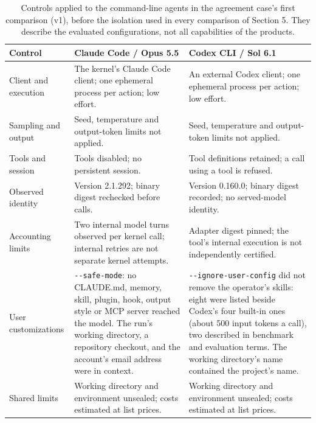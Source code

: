 \begin{longtable}{@{}P{1.25in}P{2.6in}P{2.6in}@{}}
\caption{Controls applied to the command-line agents in the agreement case's first comparison (v1), before the
isolation used in every comparison of Section 5. They describe the evaluated configurations, not all capabilities
of the products.}
\label{tab:cli-controls}\\
\toprule
\textbf{Control} & \textbf{Claude Code / Opus 5.5} & \textbf{Codex CLI / Sol 6.1}\\
\midrule\endfirsthead
\endhead\endfoot\endlastfoot
Client and execution & The kernel's Claude Code client; one ephemeral process per action; low effort. & An external Codex client; one ephemeral process per action; low effort.\\
Sampling and output & Seed, temperature and output-token limits not applied. & Seed, temperature and output-token limits not applied.\\
Tools and session & Tools disabled; no persistent session. & Tool definitions retained; a call using a tool is refused.\\
Observed identity & Version 2.1.292; binary digest rechecked before calls. & Version 0.160.0; binary digest recorded; no served-model identity.\\
Accounting limits & Two internal model turns observed per kernel call; internal retries are not separate kernel attempts. & Adapter digest pinned; the tool's internal execution is not independently certified.\\
User customizations & \verb|--safe-mode|: no CLAUDE.md, memory, skill, plugin, hook, output style or MCP server reached the model. The run's working directory, a repository checkout, and the account's email address were in context. & \verb|--ignore-user-config| did not remove the operator's skills: eight were listed beside Codex's four built-in ones (about 500 input tokens a call), two described in benchmark and evaluation terms. The working directory's name contained the project's name.\\
Shared limits & Working directory and environment unsealed; costs estimated at list prices. & Working directory and environment unsealed; costs estimated at list prices.\\
\end{longtable}
